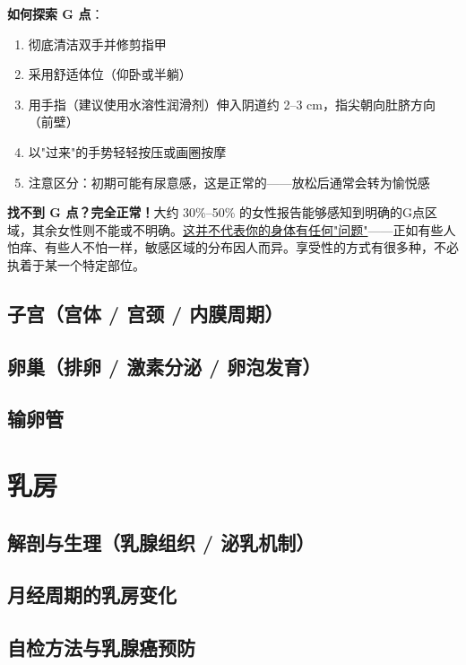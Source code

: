 \vspace{0.3em}
\noindent\textbf{如何探索 G 点}：

\begin{enumerate}
 \item 彻底清洁双手并修剪指甲
 \item 采用舒适体位（仰卧或半躺）
 \item 用手指（建议使用水溶性润滑剂）伸入阴道约 2--3 cm，指尖朝向肚脐方向（前壁）
 \item 以"过来"的手势轻轻按压或画圈按摩
 \item 注意区分：初期可能有尿意感，这是正常的——放松后通常会转为愉悦感
\end{enumerate}

\begin{tcolorbox}[colback=pink!5!white,colframe=red!50!black,title=贴心小叮咛]
\textbf{找不到 G 点？完全正常！}大约 30\%--50\% 的女性报告能够感知到明确的G点区域，其余女性则不能或不明确。\underline{这并不代表你的身体有任何"问题"}——正如有些人怕痒、有些人不怕一样，敏感区域的分布因人而异。享受性的方式有很多种，不必执着于某一个特定部位。
\end{tcolorbox}

\subsection{子宫（宫体 / 宫颈 / 内膜周期）}
\subsection{卵巢（排卵 / 激素分泌 / 卵泡发育）}
\subsection{输卵管}

\section{乳房}
\subsection{解剖与生理（乳腺组织 / 泌乳机制）}
\subsection{月经周期的乳房变化}
\subsection{自检方法与乳腺癌预防}
